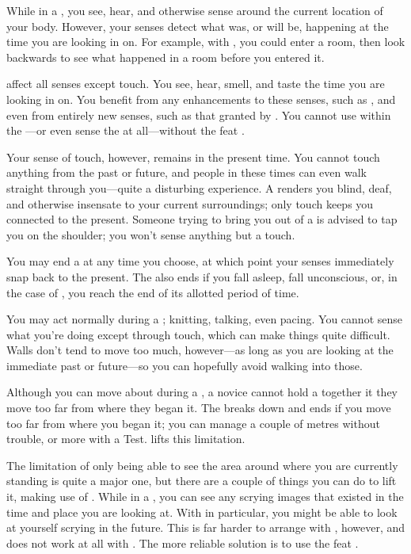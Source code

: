 While in a {\vision}, you see, hear, and otherwise sense around the current location of your body.
However, your senses detect what was, or will be, happening at the time you are looking in on.
For example, with , you could enter a room, then look backwards to see what happened in a room before you entered it.

\capital{\visions} affect all senses except touch.
You see, hear, smell, and taste the time you are looking in on.
You benefit from any enhancements to these senses, such as , and even from entirely new senses, such as that granted by .
You cannot use {\visions} within the {\mentalrealm}---or even sense the {\mentalrealm} at all---without the feat .

Your sense of touch, however, remains in the present time.
You cannot touch anything from the past or future, and people in these times can even walk straight through you---quite a disturbing experience.
A {\vision} renders you blind, deaf, and otherwise insensate to your current surroundings; only touch keeps you connected to the present.
Someone trying to bring you out of a {\vision} is advised to tap you on the shoulder; you won't sense anything but a touch.

You may end a {\vision} at any time you choose, at which point your senses immediately snap back to the present.
The {\vision} also ends if you fall asleep, fall unconscious, or, in the case of , you reach the end of its allotted period of time.

You may act normally during a {\vision}; knitting, talking, even pacing.
You cannot sense what you're doing except through touch, which can make things quite difficult.
Walls don't tend to move too much, however---as long as you are looking at the immediate past or future---so you can hopefully avoid walking into those.

Although you can move about during a {\vision}, a novice cannot hold a {\vision} together it they move too far from where they began it.
The {\vision} breaks down and ends if you move too far from where you began it; you can manage a couple of metres without trouble, or more with a Test.
 lifts this limitation.

The limitation of only being able to see the area around where you are currently standing is quite a major one, but there are a couple of things you can do to lift it, making use of .
While in a {\vision}, you can see any scrying images that existed in the time and place you are looking at.
With  in particular, you might be able to look at yourself scrying in the future.
This is far harder to arrange with , however, and does not work at all with .
The more reliable solution is to use the feat .

